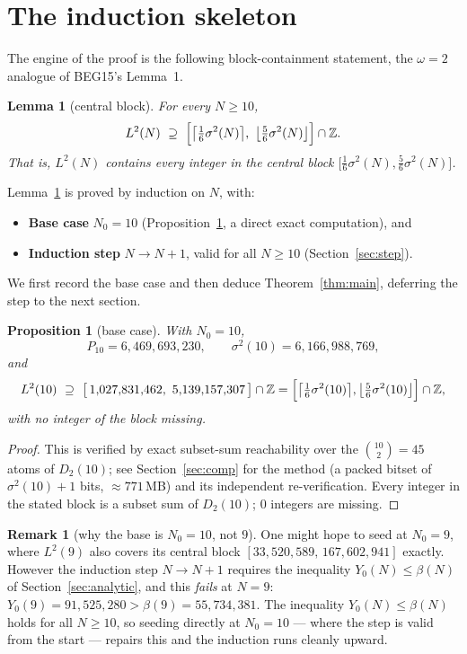 \documentclass[11pt]{amsart}
\theoremstyle{plain}
\newtheorem{lemma}[theorem]{Lemma}
\newtheorem{proposition}[theorem]{Proposition}
\theoremstyle{definition}
\newtheorem{remark}[theorem]{Remark}
\newcommand{\Z}{\mathbb{Z}}
\begin{document}
\section{The induction skeleton}\label{sec:skeleton}

The engine of the proof is the following block-containment statement, the
$\omega=2$ analogue of BEG15's Lemma~1.

\begin{lemma}[central block]\label{lem:block}
For every $N\ge 10$,
\[
L^2(N)\ \supseteq\ \Bigl[\bigl\lceil\tfrac16\sigma^2(N)\bigr\rceil,\
\bigl\lfloor\tfrac56\sigma^2(N)\bigr\rfloor\Bigr]\cap\Z .
\]
That is, $L^2(N)$ contains \emph{every} integer in the central block
$\bigl[\tfrac16\sigma^2(N),\tfrac56\sigma^2(N)\bigr]$.
\end{lemma}

Lemma~\ref{lem:block} is proved by induction on $N$, with:
\begin{itemize}[leftmargin=1.5em]
\item \textbf{Base case} $N_0=10$ (Proposition~\ref{prop:base}, a direct exact
computation), and
\item \textbf{Induction step} $N\to N+1$, valid for all $N\ge 10$
(Section~\ref{sec:step}).
\end{itemize}
We first record the base case and then deduce Theorem~\ref{thm:main}, deferring
the step to the next section.

\begin{proposition}[base case]\label{prop:base}
With $N_0=10$,
\[
P_{10}=6{,}469{,}693{,}230,\qquad \sigma^2(10)=6{,}166{,}988{,}769,
\]
and
\[
L^2(10)\ \supseteq\ \bigl[\,1{,}027{,}831{,}462,\ 5{,}139{,}157{,}307\,\bigr]\cap\Z
=\Bigl[\bigl\lceil\tfrac16\sigma^2(10)\bigr\rceil,
\bigl\lfloor\tfrac56\sigma^2(10)\bigr\rfloor\Bigr]\cap\Z,
\]
with no integer of the block missing.
\end{proposition}

\begin{proof}
This is verified by exact subset-sum reachability over the $\binom{10}{2}=45$
atoms of $D_2(10)$; see Section~\ref{sec:comp} for the method (a packed bitset of
$\sigma^2(10)+1$ bits, $\approx 771$\,MB) and its independent re-verification.
Every integer in the stated block is a subset sum of $D_2(10)$; $0$ integers are
missing.
\end{proof}

\begin{remark}[why the base is $N_0=10$, not $9$]\label{rem:base9}
One might hope to seed at $N_0=9$, where $L^2(9)$ also covers its central block
$[33{,}520{,}589,\,167{,}602{,}941]$ exactly.  However the induction step
$N\to N+1$ requires the inequality $Y_0(N)\le \beta(N)$ of
Section~\ref{sec:analytic}, and this \emph{fails} at $N=9$:
$Y_0(9)=91{,}525{,}280>\beta(9)=55{,}734{,}381$.  The inequality $Y_0(N)\le \beta(N)$
holds for all $N\ge 10$, so seeding directly at $N_0=10$ --- where the step is
valid from the start --- repairs this and the induction runs cleanly upward.
\end{remark}
\end{document}

